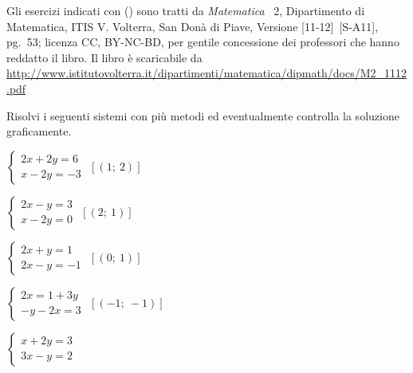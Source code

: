 Gli esercizi indicati con (\croce) sono tratti da \emph{Matematica }~2, 
Dipartimento di
Matematica, ITIS V. Volterra, San Donà di Piave, Versione [11-12]~[S-A11], 
pg.~53; licenza CC, BY-NC-BD, per gentile concessione dei
professori che hanno reddatto il libro. Il libro è scaricabile da 
\url{
http://www.istitutovolterra.it/dipartimenti/matematica/dipmath/docs/M2_1112.pdf}


\begin{esercizio}[\Ast]
 \label{ese:22.67}
 Risolvi i seguenti sistemi con più metodi ed eventualmente controlla
la soluzione graficamente.
\begin{multicols}{2}
\begin{enumeratea}
\item \(\left\{\begin{array}{l}{2x+2y=6}\\{x-2y=-3}\end{array}\right.\)
 \hfill \(\left[(1;~2)\right]\)
\item \(\left\{\begin{array}{l}{2x-y=3}\\{x-2y=0}\end{array}\right.\)
 \hfill \(\left[(2;~1)\right]\)
\item \(\left\{\begin{array}{l}2x+y=1 \\2x-y=-1\end{array}\right.\)
 \hfill \(\left[(0;~1)\right]\)
\item \(\left\{\begin{array}{l}2x=1+3y\\-y-2x=3\end{array}\right.\)
 \hfill \(\left[(-1;~-1)\right]\)
\item \(\left\{\begin{array}{l}x+2y=3 \\3x-y=2\end{array}\right.\)

\end{enumeratea}
\end{multicols}
\end{esercizio}
